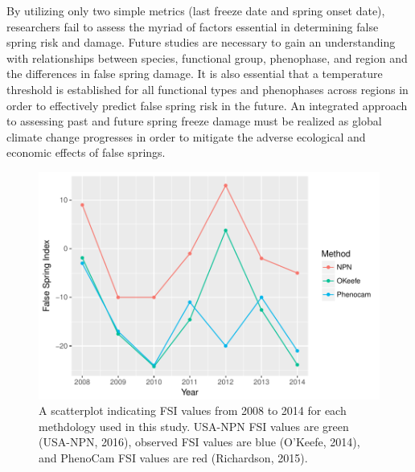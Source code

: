 \documentclass{article}\usepackage[]{graphicx}\usepackage[]{color}
\makeatletter
\def\maxwidth{ %
  \ifdim\Gin@nat@width>\linewidth
    \linewidth
  \else
    \Gin@nat@width
  \fi
}
\makeatother
\begin{document}
By utilizing only two simple metrics (last freeze date and spring onset date), researchers fail to assess the myriad of factors essential in determining false spring risk and damage. Future studies are necessary to gain an understanding with relationships between species, functional group, phenophase, and region and the differences in false spring damage. It is also essential that a temperature threshold is established for all functional types and phenophases across regions in order to effectively predict false spring risk in the future. An integrated approach to assessing past and future spring freeze damage must be realized as global climate change progresses in order to mitigate the adverse ecological and economic effects of false springs.



\begin{figure}[H]

{\centering \includegraphics[width=\maxwidth]{figure/fsifig-1} 

}

\caption[A scatterplot indicating FSI values from 2008 to 2014 for each methdology used in this study]{A scatterplot indicating FSI values from 2008 to 2014 for each methdology used in this study. USA-NPN FSI values are green (USA-NPN, 2016), observed FSI values are blue (O'Keefe, 2014), and PhenoCam FSI values are red (Richardson, 2015).}\label{fig:fsifig}
\end{figure}
\end{document}
